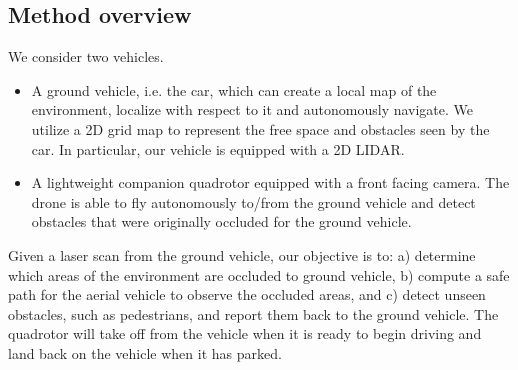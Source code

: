 
\subsection{Method overview}

We consider two vehicles.
\begin{itemize}
\item
A ground vehicle, i.e. the car, which can create a local map of the environment, localize with respect to it and autonomously navigate. We utilize a 2D grid map to represent the free space and obstacles seen by the car. In particular, our vehicle is equipped with a 2D LIDAR. 
\item
A lightweight companion quadrotor equipped with a front facing camera. The drone is able to fly autonomously to/from the ground vehicle and detect obstacles that were originally occluded for the ground vehicle.
\end{itemize}

Given a laser scan from the ground vehicle, our objective is to:
a) determine which areas of the environment are occluded to ground vehicle,
b) compute a safe path for the aerial vehicle to observe the occluded areas,
and c) detect unseen obstacles, such as pedestrians, and report them back to
the ground vehicle. The quadrotor will take off from the vehicle when it is
ready to begin driving and land back on the vehicle when it has parked.


%
%
%

